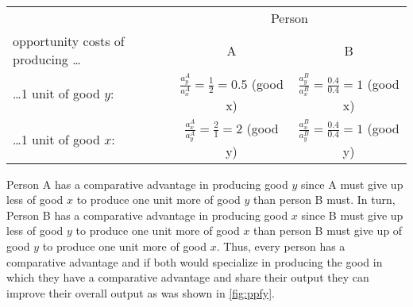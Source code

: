 	\begin{center}
		\begin{tabular}{lcc}\toprule
			&\multicolumn{2}{c}{Person}\\\cmidrule{2-3}
			opportunity costs of producing \dots	&A &B\\		\midrule
			\dots1 unit of good $y$: & $\frac{a_y^A}{a_x^A}=\frac{1}{2}=0.5$  (good x) & $\frac{a_y^B}{a_x^B}=\frac{0.4}{0.4}=1$ (good x) \\
			\dots1 unit of good $x$: & $\frac{a_x^A}{a_y^A}=\frac{2}{1}=2$  (good y) & $\frac{a_x^B}{a_y^B}=\frac{0.4}{0.4}=1$  (good y) \\\bottomrule
		\end{tabular}
	\end{center}\medskip
	
Person A has a comparative advantage in producing good $y$ since A must give up less of good $x$ to produce one unit more of good $y$ than person B must. 
In turn, Person B has a comparative advantage in producing good $x$ since B must give up less of good $y$ to produce one unit more of good $x$ than person B must give up of good $y$ to produce one unit more of good $x$. 
Thus, every person has a comparative advantage and if both would specialize in producing the good in which they have a comparative advantage and share their output they can improve their overall output as was shown in \autoref{fig:ppfy}. 


%	
	
%	
	
